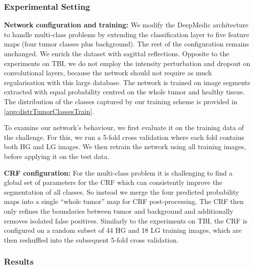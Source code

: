 \documentclass[preprint,authoryear,12pt]{elsarticle}
\newcommand{\quot}[1]{``#1''}
\begin{document}
\subsubsection{Experimental Setting}

\textbf{Network configuration and training:} We modify the DeepMedic architecture to handle multi-class problems by extending the classification layer to five feature maps (four tumor classes plus background). The rest of the configuration remains unchanged. We enrich the dataset with sagittal reflections. Opposite to the experiments on TBI, we do not employ the intensity perturbation and dropout on convolutional layers, because the network should not require as much regularisation with this large database. The network is trained on image segments extracted with equal probability centred on the whole tumor and healthy tissue. The distribution of the classes captured by our training scheme is provided in \ref{app:distrTumorClassesTrain}.

To examine our network's behaviour, we first evaluate it on the training data of the challenge. For this, we run a 5-fold cross validation where each fold contains both HG and LG images. We then retrain the network using all training images, before applying it on the test data.

\textbf{CRF configuration:} For the multi-class problem it is challenging to find a global set of parameters for the CRF which can consistently improve the segmentation of all classes. So instead we merge the four predicted probability maps into a single \quot{whole tumor} map for CRF post-processing. The CRF then only refines the boundaries between tumor and background and additionally removes isolated false positives. Similarly to the experiments on TBI, the CRF is configured on a random subset of 44 HG and 18 LG training images, which are then reshuffled into the subsequent 5-fold cross validation. 

\subsubsection{Results}
\label{subsubsec:resBrats2015}
\end{document}
